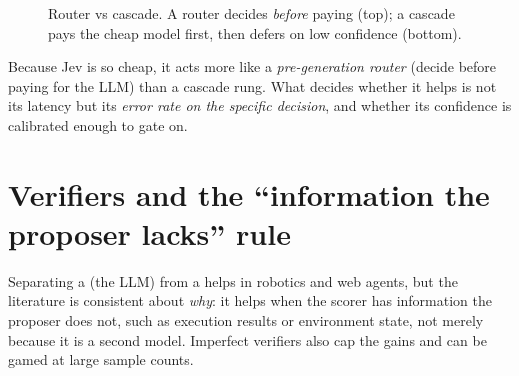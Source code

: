 \begin{figure}[h]\centering
{}
\par\vspace{6mm}
\caption{Router vs cascade. A router decides \emph{before} paying (top); a cascade pays the
cheap model first, then defers on low confidence (bottom).}
\label{fig:routercascade}
\end{figure}

\begin{keyidea}
Because Jev is so cheap, it acts more like a \emph{pre-generation router} (decide before
paying for the LLM) than a cascade rung. What decides whether it helps is not its latency
but its \emph{error rate on the specific decision}, and whether its confidence is calibrated
enough to gate on.
\end{keyidea}

\section{Verifiers and the ``information the proposer lacks'' rule}

Separating a  (the LLM) from a  helps in robotics and
web agents, but the literature is consistent about \emph{why}: it helps when the scorer has
information the proposer does not, such as execution results or environment state, not merely
because it is a second model. Imperfect verifiers also cap the gains and can be gamed at
large sample counts.

